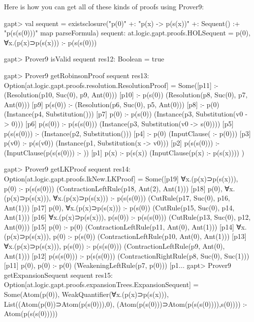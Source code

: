 \documentclass[a4paper,11pt]{article}
\begin{document}
Here is how you can get all of these kinds of proofs using Prover9:
\begin{clilisting}
gapt> val sequent = existsclosure("p(0)" +: "p(x) -> p(s(x))" +: Sequent() :+ "p(s(s(0)))" map parseFormula)
sequent: at.logic.gapt.proofs.HOLSequent = p(0), ∀x.(p(x)⊃p(s(x))) :- p(s(s(0)))

gapt> Prover9 isValid sequent
res12: Boolean = true

gapt> Prover9 getRobinsonProof sequent
res13: Option[at.logic.gapt.proofs.resolution.ResolutionProof] =
Some([p11]  :-     (Resolution(p10, Suc(0), p9, Ant(0)))
[p10]  :- p(s(0))    (Resolution(p8, Suc(0), p7, Ant(0)))
[p9] p(s(0)) :-     (Resolution(p6, Suc(0), p5, Ant(0)))
[p8]  :- p(0)    (Instance(p4, Substitution()))
[p7] p(0) :- p(s(0))    (Instance(p3, Substitution(v0 -> 0)))
[p6] p(s(0)) :- p(s(s(0)))    (Instance(p3, Substitution(v0 -> s(0))))
[p5] p(s(s(0))) :-     (Instance(p2, Substitution()))
[p4]  :- p(0)    (InputClause( :- p(0)))
[p3] p(v0) :- p(s(v0))    (Instance(p1, Substitution(x -> v0)))
[p2] p(s(s(0))) :-     (InputClause(p(s(s(0))) :- ))
[p1] p(x) :- p(s(x))    (InputClause(p(x) :- p(s(x))))
)

gapt> Prover9 getLKProof sequent
res14: Option[at.logic.gapt.proofs.lkNew.LKProof] =
Some([p19] ∀x.(p(x)⊃p(s(x))), p(0) :- p(s(s(0)))    (ContractionLeftRule(p18, Ant(2), Ant(1)))
[p18] p(0), ∀x.(p(x)⊃p(s(x))), ∀x.(p(x)⊃p(s(x))) :- p(s(s(0)))    (CutRule(p17, Suc(0), p16, Ant(1)))
[p17] p(0), ∀x.(p(x)⊃p(s(x))) :- p(s(0))    (CutRule(p15, Suc(0), p14, Ant(1)))
[p16] ∀x.(p(x)⊃p(s(x))), p(s(0)) :- p(s(s(0)))    (CutRule(p13, Suc(0), p12, Ant(0)))
[p15] p(0) :- p(0)    (ContractionLeftRule(p11, Ant(0), Ant(1)))
[p14] ∀x.(p(x)⊃p(s(x))), p(0) :- p(s(0))    (ContractionLeftRule(p10, Ant(0), Ant(1)))
[p13] ∀x.(p(x)⊃p(s(x))), p(s(0)) :- p(s(s(0)))    (ContractionLeftRule(p9, Ant(0), Ant(1)))
[p12] p(s(s(0))) :- p(s(s(0)))    (ContractionRightRule(p8, Suc(0), Suc(1)))
[p11] p(0), p(0) :- p(0)    (WeakeningLeftRule(p7, p(0)))
[p1...
gapt> Prover9 getExpansionSequent sequent
res15: Option[at.logic.gapt.proofs.expansionTrees.ExpansionSequent] = Some(Atom(p(0)), WeakQuantifier(∀x.(p(x)⊃p(s(x))), List((Atom(p(0))⊃Atom(p(s(0))),0), (Atom(p(s(0)))⊃Atom(p(s(s(0)))),s(0)))) :- Atom(p(s(s(0)))))

\end{clilisting}
\end{document}

